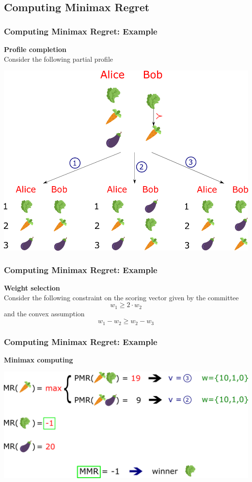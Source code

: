 \documentclass{beamer}
\begin{document}
\subsection{Computing Minimax Regret}
\begin{frame}[t]
	\frametitle{Computing Minimax Regret: Example}
	\textbf{Profile completion}\\
	Consider the following partial profile
	\begin{center}
		\includegraphics[scale=0.35]{completion2.png}
	\end{center}
\end{frame}
\begin{frame}[t]
	\frametitle{Computing Minimax Regret: Example}
	\textbf{Weight selection} \\ \bigskip
	Consider the following constraint on the scoring vector given by the committee
	\[w_1 \geq 2 \cdot w_2\]
	and the convex assumption
	\[w_1 - w_2 \geq w_2 - w_3 \]

\end{frame}
\begin{frame}[t]
	\frametitle{Computing Minimax Regret: Example}
	\textbf{Minimax computing}\\
	\begin{center}
		\includegraphics[scale=0.35]{comp.png}
	\end{center}
\end{frame}
\end{document}
